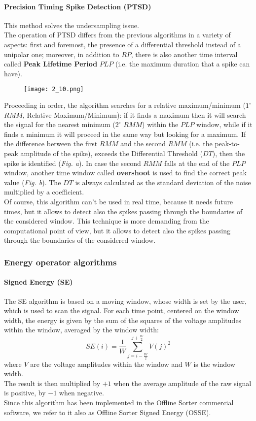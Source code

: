 \paragraph{Precision Timing Spike Detection (PTSD)}
This method solves the undersampling issue. \\ The operation of PTSD differs from the previous
algorithms in a variety of aspects: first and foremost, the presence of a differential threshold
instead of a unipolar one; moreover, in addition to \(RP\), there is also another time interval
called \textbf{Peak Lifetime Period} \(PLP\) (i.e. the maximum duration that a spike can have).
\begin{figure}[H]
    \centering
    \texttt{[image: 2\_10.png]}
\end{figure}
Proceeding in order, the algorithm searches for a relative maximum/minimum (\(1^\circ\) \(RMM\),
Relative Maximum/Minimum): if it finds a maximum then it will search the signal for
the nearest minimum (\(2^\circ\) \(RMM\)) within the \(PLP\) window, while if it finds a minimum it will proceed
in the same way but looking for a maximum. If the difference between the first \(RMM\) and the second \(RMM\)
(i.e. the peak-to-peak amplitude of the spike), exceeds the Differential Threshold (\(DT\)),
then the spike is identified (\textit{Fig. a}). In case the second \(RMM\) falls at the end of the \(PLP\) window,
another time window called \textbf{overshoot} is used to find the correct peak value (\textit{Fig. b}). The \(DT\) is
always calculated as the standard deviation of the noise multiplied by a coefficient.\\
Of course, this algorithm can't be used in real time, because it needs future times, but it allows to detect also the
spikes passing through the boundaries of the considered window.
This technique is more demanding from the computational point of view, but it allows to detect
also the spikes passing through the boundaries of the considered window.
\subsubsection{Energy operator algorithms}
\paragraph{Signed Energy (SE)}
The SE algorithm is based on a moving window, whose width is set by the user,
which is used to scan the signal. For each time point, centered on the window width,
the energy is given by the sum of the squares of the voltage amplitudes within the
window, averaged by the window width:
\begin{equation*}
    SE(i)=\frac{1}{W}\sum_{j=i-\frac{W}{2}}^{j+\frac{W}{2}}V(j)^2
\end{equation*}
where \(V\) are the voltage amplitudes within the window and \(W\) is the window width.\\
The result is then multiplied by \(+1\) when the average amplitude of the raw signal is positive,
by \(-1\) when negative.\\
Since this algorithm has been implemented in the Offline Sorter commercial software,
we refer to it also as Offline Sorter Signed Energy (OSSE).
